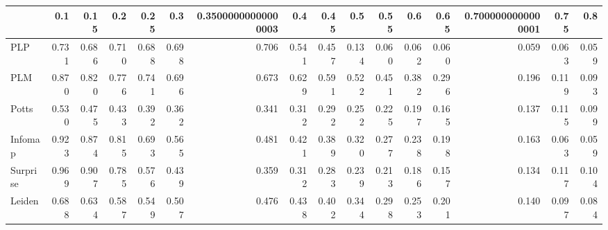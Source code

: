 \begin{tabular}{lrrrrrrrrrrrrrrr}
\toprule
{} &   0.1 &  0.15 &   0.2 &  0.25 &   0.3 & 0.35000000000000003 &   0.4 &  0.45 &   0.5 &  0.55 &   0.6 &  0.65 & 0.7000000000000001 &  0.75 &   0.8 \\
\midrule
PLP      & 0.731 & 0.686 & 0.710 & 0.688 & 0.698 &               0.706 & 0.541 & 0.457 & 0.134 & 0.060 & 0.062 & 0.060 &              0.059 & 0.063 & 0.059 \\
PLM      & 0.870 & 0.820 & 0.776 & 0.741 & 0.696 &               0.673 & 0.629 & 0.591 & 0.522 & 0.451 & 0.382 & 0.296 &              0.196 & 0.119 & 0.093 \\
Potts    & 0.530 & 0.475 & 0.433 & 0.392 & 0.362 &               0.341 & 0.312 & 0.292 & 0.252 & 0.225 & 0.197 & 0.165 &              0.137 & 0.115 & 0.099 \\
Infomap  & 0.923 & 0.874 & 0.815 & 0.693 & 0.565 &               0.481 & 0.421 & 0.389 & 0.320 & 0.277 & 0.238 & 0.198 &              0.163 & 0.063 & 0.059 \\
Surprise & 0.969 & 0.907 & 0.785 & 0.576 & 0.439 &               0.359 & 0.312 & 0.283 & 0.239 & 0.213 & 0.186 & 0.157 &              0.134 & 0.117 & 0.104 \\
Leiden   & 0.688 & 0.634 & 0.587 & 0.549 & 0.507 &               0.476 & 0.438 & 0.402 & 0.344 & 0.298 & 0.253 & 0.201 &              0.140 & 0.097 & 0.084 \\
\bottomrule
\end{tabular}
